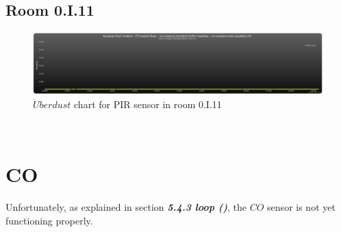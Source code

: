 \documentclass[12pt,a4paper,draft]{report}
\begin{document}
\subsection{Room 0.I.11}
%
\begin{figure}[H]
\centering
	\includegraphics*[scale=0.3]{ch4_11}
	\caption{$\ddot{U}berdust$ chart for PIR sensor in room 0.I.11}
	\label{chart_ch4_11}
\end{figure}
\ \\
%
\section{CO}
%
Unfortunately, as explained in section \textit{\textbf{5.4.3 loop ()}}, the $CO$ sensor is not yet functioning properly.
\newpage
%
\end{document}
